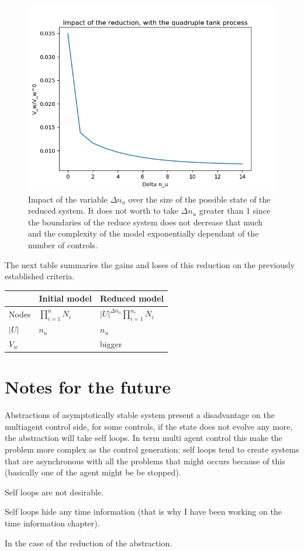 \documentclass{article}
\theoremstyle{named}
\begin{document}
\begin{figure}[!ht]
  \centering
  \includegraphics[width=0.9\linewidth]{lin_sys_reduction_seq_control_len}
  \caption{Impact of the variable $\Delta n_u$ over the size of the possible state of the reduced system. It does not worth to take $\Delta n_u$ greater than 1 since the boundaries of the reduce system does not decrease that much and the complexity of the model exponentially dependant of the number of controls.}
  \label{reduced_system_bounds}
\end{figure}

The next table summaries the gains and loses of this reduction on the previously established criteria.

\begin{tabular}{ l|ll }
& Initial model & Reduced model\\ \hline
Nodes & $\prod_{i=1}^n N_i$ & $\left | U \right |^{\Delta n_u} \prod_{i=1}^{n_c} N_i $\\ 
$|U|$ & $n_u$ & $n_u$\\
$V_w$ &  & bigger \\
\end{tabular}

\section{Notes for the future}
Abstractions of asymptotically stable system present a disadvantage on the multiagent control side, for some controls, if the state does not evolve any more, the abstraction will take self loops.
In term multi agent control this make the problem more complex as the control generation: self loops tend to create systems that are asynchronous with all the problems that might occurs because of this (basically one of the agent might be be stopped).

Self loops are not desirable.

Self loops hide any time information (that is why I have been working on the time information chapter).

In the case of the reduction of the abstraction.

{}

\end{document}
